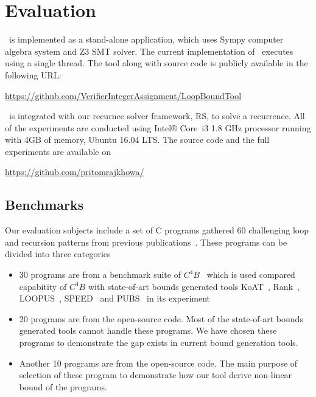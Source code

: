 \section{Evaluation}
\label{sec:evaluation}

\SystemName\ is implemented  as a stand-alone application, which uses Sympy \cite{joyner2012open} computer algebra system  and Z3 \cite{de2008z3} SMT solver.
The current implementation of \SystemName\ executes using a single thread. The tool along with source code is  publicly available  in the following URL:

\url{https://github.com/VerifierIntegerAssignment/LoopBoundTool}

\SystemName\ is integrated with our recurnce solver framework, RS, to solve a recurrence. All of the experiments are conducted using Intel$\circledR$ Core\texttrademark\ i3 1.8 GHz processor running with 4GB of memory, Ubuntu 16.04 LTS. The source code and the full experiments are available on

\url{https://github.com/pritomrajkhowa/}

\subsection{Benchmarks}
 Our evaluation subjects include a set of C programs gathered 60 challenging loop and recursion patterns from previous publications~\cite{Gulwani:2010:RP:1806596.1806630,speed1,Carbonneaux:2015:CCR:2737924.2737955}. These programs can be divided into three categories
\begin{itemize}
	\item 30 programs are from a benchmark suite of $C^4B$~\cite{Carbonneaux:2015:CCR:2737924.2737955} which is used compared capabitity of $C^4B$ with state-of-art bounds generated tools KoAT~\cite{Brockschmidt:2016:ARS:2982214.2866575}, Rank~\cite{Alias:2010:MRP:1882094.1882102}, LOOPUS~\cite{10.1007/978-3-319-08867-9_50}, SPEED~\cite{speed1} and PUBS~\cite{Albert:2012:CAO:2076807.2077025} in its experiment
	
	\item 20 programs are from the open-source code. Most of the state-of-art bounds generated tools cannot handle these programs. We have chosen these programs to demonstrate the gap exists in current bound generation tools.
	
	\item Another 10 programs are from the open-source code. The main purpose of selection of these program to demonstrate how our tool derive non-linear bound of the programs.  
	

	
	

	
	
\end{itemize}





